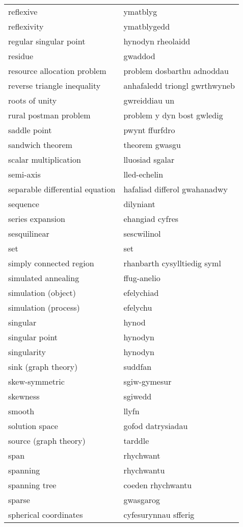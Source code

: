 \begin{supertabular}{p{0.22\textwidth}p{0.22\textwidth}}
reflexive & ymatblyg \\
reflexivity & ymatblygedd \\
regular singular point & hynodyn rheolaidd \\
residue & gwaddod \\
resource allocation problem & problem dosbarthu adnoddau \\
reverse triangle inequality & anhafaledd triongl gwrthwyneb \\
roots of unity & gwreiddiau un \\
rural postman problem & problem y dyn bost gwledig \\
saddle point & pwynt ffurfdro \\
sandwich theorem & theorem gwasgu \\
scalar multiplication & lluosiad sgalar \\
semi-axis & lled-echelin \\
separable differential equation & hafaliad differol gwahanadwy \\
sequence & dilyniant \\
series expansion & ehangiad cyfres \\
sesquilinear & sescwilinol \\
set & set \\
simply connected region & rhanbarth cysylltiedig syml \\
simulated annealing & ffug-anelio \\
simulation (object) & efelychiad \\
simulation (process) & efelychu \\
singular & hynod \\
singular point & hynodyn \\
singularity & hynodyn \\
sink (graph theory) & suddfan \\
skew-symmetric & sgiw-gymesur \\
skewness & sgiwedd \\
smooth & llyfn \\
solution space & gofod datrysiadau \\
source (graph theory) & tarddle \\
span & rhychwant \\
spanning & rhychwantu \\
spanning tree & coeden rhychwantu \\
sparse & gwasgarog \\
spherical coordinates & cyfesurynnau sfferig \\

\end{supertabular}
